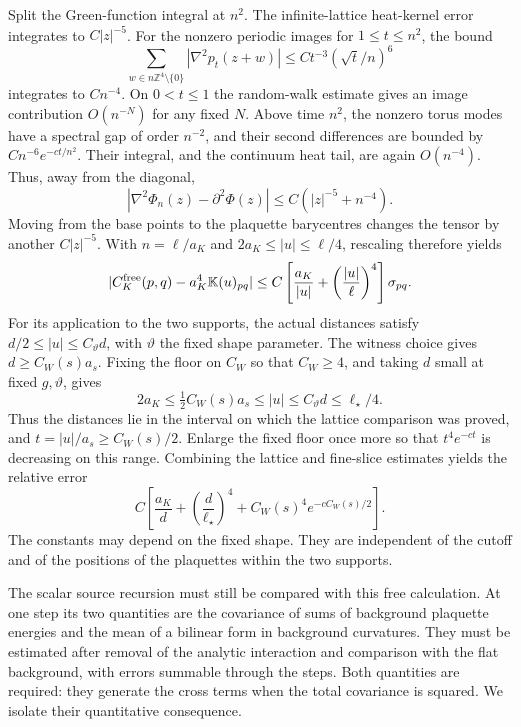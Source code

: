 \documentclass[11pt,letterpaper,reqno]{amsart}
\theoremstyle{definition}
\theoremstyle{remark}
\begin{document}
Split the Green-function integral at $n^2$. The infinite-lattice
heat-kernel error integrates to $C|z|^{-5}$. For the nonzero
periodic images for $1\le t\le n^2$, the bound
\[
 \sum_{w\in n\mathbb Z^4\setminus\{0\}}
       |\nabla^2p_t(z+w)|\le Ct^{-3}(\sqrt t/n)^6
\]
integrates to $Cn^{-4}$. On $0<t\le1$ the random-walk estimate
gives an image contribution $O(n^{-N})$ for any fixed $N$.
Above time $n^2$, the nonzero torus
modes have a spectral gap of order $n^{-2}$, and their second
differences are bounded by $Cn^{-6}e^{-ct/n^2}$. Their integral,
and the continuum heat tail, are again $O(n^{-4})$. Thus, away
from the diagonal,
\[
 |\nabla^2\Phi_n(z)-\partial^2\Phi(z)|
                                    \le C(|z|^{-5}+n^{-4}).
\]
Moving from the base points to the plaquette barycentres changes
the tensor by another $C|z|^{-5}$. With $n=\ell/a_K$ and
$2a_K\le|u|\le\ell/4$, rescaling therefore yields
\[
 |C_K^{\rm free}(p,q)-a_K^4\mathbb K(u)_{pq}|
 \le C\left[\frac{a_K}{|u|}
                 +\left(\frac{|u|}{\ell}\right)^4\right]\sigma_{pq}.
\]
For its application to the two supports, the actual distances
satisfy $d/2\le|u|\le C_\vartheta d$, with $\vartheta$
the fixed shape parameter. The witness choice gives
$d\ge C_W(s)a_s$. Fixing the floor on $C_W$ so that
$C_W\ge4$, and taking $d$ small at fixed $g,\vartheta$,
gives
\[
 2a_K\le\tfrac12C_W(s)a_s\le|u|
                         \le C_\vartheta d\le\ell_\star/4.
\]
Thus the distances lie in the interval on which the lattice
comparison was proved, and $t=|u|/a_s\ge C_W(s)/2$.
Enlarge the fixed floor once more so that $t^4e^{-ct}$ is
decreasing on this range. Combining the lattice and fine-slice
estimates yields the relative error
\[
 C\left[\frac{a_K}{d}
        +\left(\frac d{\ell_\star}\right)^4
        +C_W(s)^4e^{-cC_W(s)/2}\right].
\]
The constants may depend on the fixed shape. They are
independent of the cutoff and of the positions of the
plaquettes within the two supports.

The scalar source recursion must still be compared with this free
calculation. At one step its two quantities are the covariance of sums
of background plaquette energies and the mean of a bilinear form in
background curvatures. They must be estimated after removal of the
analytic interaction and comparison with the flat background, with
errors summable through the steps. Both quantities are required: they
generate the cross terms when the total covariance is squared. We
isolate their quantitative consequence.
\end{document}
